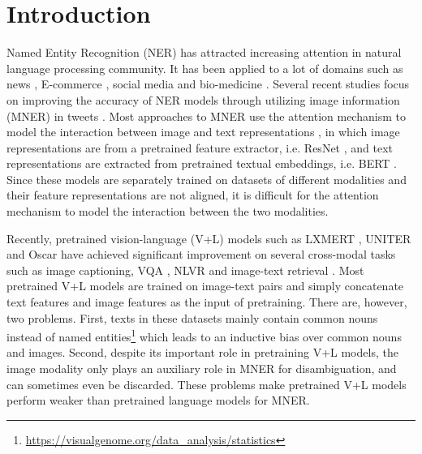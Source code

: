 \documentclass[11pt]{article}
\begin{document}
\section{Introduction}
Named Entity Recognition (NER) \cite{Sundheim1995NamedET} has attracted increasing attention in natural language processing community. It has been applied to a lot of domains such as news \citep{tjong-kim-sang-2002-introduction,tjong-kim-sang-de-meulder-2003-introduction}, E-commerce \citep{10.1145/3404835.3463102}, social media \cite{strauss-etal-2016-results,derczynski-etal-2017-results} and bio-medicine \citep{dougan2014ncbi,li2016biocreative}. Several recent studies focus on improving the accuracy of NER models through utilizing image information (MNER) in tweets \citep{zhang2018adaptive,moon-etal-2018-multimodal,lu-etal-2018-visual}. Most approaches to MNER use the attention mechanism to model the interaction between image and text representations \citep{yu-etal-2020-improving-multimodal,zhang2021multi,Sun2021RpBERTAT}, in which image representations are from a pretrained feature extractor, i.e. ResNet \citep{he2016deep}, and text representations are extracted from pretrained textual embeddings, i.e. BERT \citep{devlin-etal-2019-bert}. Since these models are separately trained on datasets of different modalities and their feature representations are not aligned, it is difficult for the attention mechanism to model the interaction between the two modalities. 




Recently, pretrained vision-language (V+L) models such as LXMERT \citep{Tan2019LXMERTLC}, UNITER \citep{chen2020uniter} and Oscar \citep{li2020oscar} have achieved significant improvement on several cross-modal tasks such as image captioning, VQA \citep{Agrawal2015VQAVQ}, NLVR \citep{Young2014FromID} and image-text retrieval \citep{Suhr2019ACF}. Most pretrained V+L models are trained on image-text pairs and simply concatenate text features and image features as the input of pretraining. There are, however, two problems. First, texts in these datasets mainly contain common nouns instead of named entities\footnote{\url{https://visualgenome.org/data_analysis/statistics}} which leads to an inductive bias over common nouns and images. Second, despite its important role in pretraining V+L models,  the image modality only plays an auxiliary role in MNER for disambiguation, and can sometimes even be discarded. These problems make pretrained V+L models perform weaker than pretrained language models for MNER.
\end{document}
